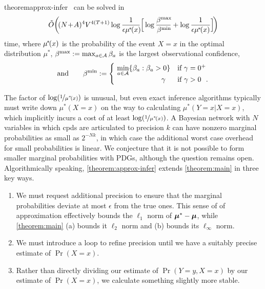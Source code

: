 \begin{linked}{theorem}{approx-infer}
\ApproxInferUniq\ can be solved in
\def\mustar{\mu^{\mskip-2mu*\!}}
\begin{align*}
    \tilde O \pqty[\bigg]{ \! (N\!+\!A)^4 V^{4(T+1)}
    \log \frac1{\epsilon \mustar(x)\!}
    \Big[
          \log \frac{\beta^{\max}\!}{\beta^{\min}\!} 
           + \log \frac1{\epsilon  \mustar(x)} 
    \Big]\! }
\end{align*}
time,
where $\mustar(x)$ is the probability of the event $X{=}x$ in the optimal
distribution $\mu^*$, 
 $\beta^{\max} := \max_{{a \in \mathcal A}} \beta_a$ is the largest observational confidence, 
\[
\text{and}\qquad
\beta^{\min} := 
\begin{cases}
    ~\displaystyle\min_{a \in \Ar} \{ \beta_a : \beta_a > 0\}& \text{if}~ \gamma = 0^+\\[-0.5ex]
    ~\hfill\gamma~~ & \text{if}~ \gamma > 0~~\text{.}
\end{cases}
\]
\end{linked}

The factor of $\log(\nicefrac1{\mu^*\!(x)})$ is unusual, 
but even exact inference algorithms typically must write down $\mu^*(X{=}x)$
on the way to calculating $\mu^*(Y{=}x|X{=}x)$, which implicitly incurs 
a cost of at least $\log(\nicefrac1{\mu^*\!(x)})$. 
A Bayesian network with $N$ variables in which cpds are articulated to precision $k$
can have nonzero marginal probabilities as small as $2^{- N k}$,
    in which case the additional worst case overhead for small probabilities is linear. 
We conjecture that it is not possible to form smaller marginal probabilities with PDGs, although the question remains open. 
Algorithmically speaking,
\cref{theorem:approx-infer} extends \cref{theorem:main} 
in three key ways. 

\begin{enumerate}
\item We must request additional precision 
    to ensure that the marginal probabilities deviate at most $\epsilon$
    from the true ones.  This sense of of approximation effectively
    bounds the $\ell_1$ norm of $\boldsymbol\mu^* - \boldsymbol\mu$,
    while \cref{theorem:main} (a) bounds it $\ell_2$ norm and
    (b) bounds its $\ell_\infty$ norm.

\item We must introduce a loop to refine precision until we have a suitably precise estimate of $\Pr(X{=}x)$.

\item Rather than directly dividing our estimate of $\Pr(Y{=}y,X{=}x)$ by our estimate of $\Pr(X{=}x)$, we calculate something slightly more stable. 
\end{enumerate}

